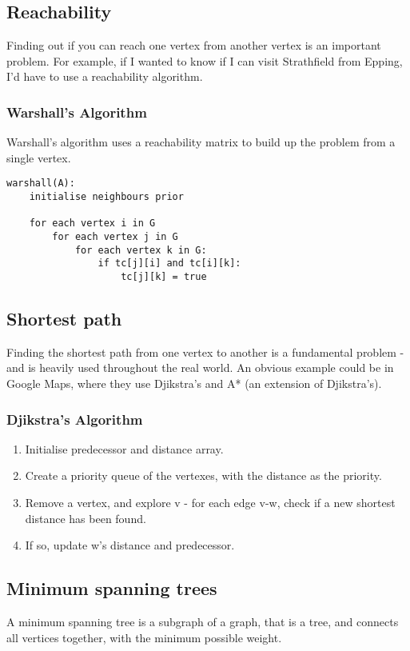 \documentclass[14]{article}
\begin{document}
\subsection{Reachability}
Finding out if you can reach one vertex from another vertex is an important problem. For example, if I wanted to know if I can
visit Strathfield from Epping, I'd have to use a reachability algorithm. 
\subsubsection{Warshall's Algorithm}
Warshall's algorithm uses a reachability matrix to build up the problem from a single vertex. 
\begin{verbatim}
warshall(A):
    initialise neighbours prior

    for each vertex i in G
        for each vertex j in G
            for each vertex k in G:
                if tc[j][i] and tc[i][k]:
                    tc[j][k] = true
\end{verbatim}
\subsection{Shortest path}
Finding the shortest path from one vertex to another is a fundamental problem - and is heavily used throughout the real world.
An obvious example could be in Google Maps, where they use Djikstra's and A* (an extension of Djikstra's).
\subsubsection{Djikstra's Algorithm}
\begin{enumerate}
    \item Initialise predecessor and distance array. 
    \item Create a priority queue of the vertexes, with the distance as the priority.
    \item Remove a vertex, and explore v - for each edge v-w, check if a new shortest distance has been found.
    \item If so, update w's distance and predecessor.
\end{enumerate}
\subsection{Minimum spanning trees}
A minimum spanning tree is a subgraph of a graph, that is a tree, and connects all vertices together, with the minimum
possible weight.
\end{document}
